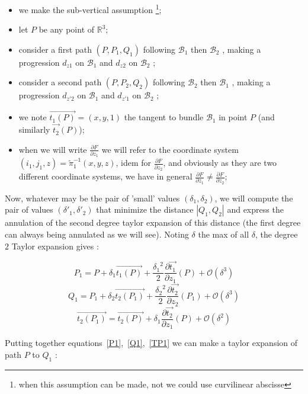 \documentclass{ipol}
\newcommand{\RR}{\ensuremath{\mathbb{R}}}
\newcommand{\Bund}[1]{\ensuremath{\mathcal{B}_{#1}}}
\newcommand{\BundO}{\Bund{1}}
\newcommand{\BundT}{\Bund{2}}
\newcommand{\BigV}[1]{\ensuremath{\overrightarrow{#1}}}
\newcommand{\TanO}[1]{\BigV{t_1#1}}
\newcommand{\TanT}[1]{\BigV{t_2#1}}
\newcommand{\Negl}[1]{\ensuremath{\mathcal{O}(#1)}}
\newcommand{\PiVert}{\widetilde{\pi}}
\newcommand{\DerPart}[2]{\frac{\partial #1}{\partial #2}}
\begin{document}
\begin{itemize}
   \item we make the sub-vertical assumption \footnote{when this assumption can be made,
          not we could use curvilinear abscisse};
   \item let $P$ be any point of $\RR^3$;
   \item consider a first path $(P,P_1,Q_1)$ following  $\BundO$ then $\BundT$ , making a
         progression $d_{z1}$ on $\BundO$ and  $d_{z2}$ on $\BundT$ ;
   \item consider a second path $(P,P_2,Q_2)$ following  $\BundT$ then $\BundO$ , making a
         progression $d_{z'2}$ on $\BundO$ and  $d_{z'1}$ on $\BundT$ ;
   \item we note $\overrightarrow{t_1(P)}=(x,y,1)$ the tangent to bundle  $\BundO$  in point $P$
         (and similarly $\overrightarrow{t_2}(P)$);
   \item when we will write  $\DerPart{F}{z_1}$ we will refer to the coordinate system $(i_1,j_1,z) = \PiVert_1^{-1}(x,y,z)$,
         idem for  $\DerPart{F}{z_2}$, and obviously as they are two different coordinate systems, we have in general
        $\DerPart{F}{z_1}  \neq \DerPart{F}{z_2}$;
\end{itemize}

Now, whatever may be the pair of 'small' values $(\delta_1,\delta_2)$,  we will compute the  pair of values
$(\delta'_1,\delta'_2)$ that minimize the distance $|Q_1,Q_2|$ and express the annulation of the
second degree taylor expansion of this distance (the first degree can always being annulated as we will see). 
Noting $\delta$ the max of all $\delta$, the degree $2$ Taylor expansion gives :

\begin{equation}
    P_1 =  P +  \delta_1 \TanO{(P)} + \frac{{\delta_1}^2}{2} \DerPart { \TanO{}}{z_1}(P)  + \Negl{\delta^3} \label{P1} 
\end{equation}
\begin{equation}
    Q_1 =  P_1 +  \delta_2 \TanT{(P_1)} + \frac{{\delta_2}^2}{2} \DerPart { \TanT{}}{z_2}(P_1) + \Negl{\delta^3} \label{Q1}
\end{equation}
\begin{equation}
     \TanT{(P_1)} = \TanT{(P)} +  \delta_1   \DerPart { \TanT{}}{z_1}(P) + \Negl{\delta^2} \label{TP1}
\end{equation}

Putting together equations~\ref{P1},~\ref{Q1},~\ref{TP1} we can make a taylor expansion of path
$P$ to $Q_1$ :
\end{document}

